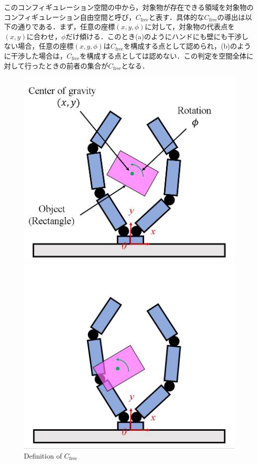 \documentclass[a4paper,twoside,12pt,papersize, dvipdfmx]{iirthesis}
\begin{document}
このコンフィギュレーション空間の中から，対象物が存在できる領域を対象物のコンフィギュレーション自由空間と呼び，$C_{\mathrm{free}}$と表す．具体的な$C_{\mathrm{free}}$の導出は以下の通りである．まず，任意の座標$(x, y, \phi)$に対して，対象物の代表点を$(x, y)$に合わせ，$\phi$だけ傾ける．このとき(a)のようにハンドにも壁にも干渉しない場合，任意の座標$(x, y, \phi)$は$C_{\mathrm{free}}$を構成する点として認められ，(b)のように干渉した場合は，$C_{\mathrm{free}}$を構成する点としては認めない．この判定を空間全体に対して行ったときの前者の集合が$C_{\mathrm{free}}$となる．
\begin{figure}[b]
\begin{minipage}{0.5\hsize}
\centering
\includegraphics[width=0.9\hsize]{fig/2-sensorless-icm/define_cfree.jpg}
\subcaption{}
\end{minipage}
\begin{minipage}{0.5\hsize}
\centering
\includegraphics[width=0.9\hsize]{fig/2-sensorless-icm/define_notcfree.jpg}
\subcaption{}
\end{minipage}
\caption{Definition of $C_{\mathrm{free}}$}
\label{fig::sicm::cfree}
\end{figure}
\end{document}
